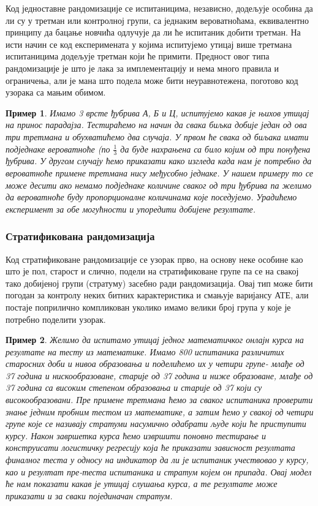 \documentclass[12pt, a4paper]{article}
\newtheorem{primer}{Пример}[section]
\begin{document}
Код једноставне рандомизације се испитаницима, независно, додељује особина да ли су у третман или контролној групи, са једнаким вероватноћама, еквивалентно принципу да бацање новчића 
одлучује да ли ће испитаник добити третман. На исти начин се код експеримената у којима испитујемо 
утицај више третмана испитаницима додељује третман који ће примити.
Предност овог типа рандомизације је што је лака за имплементацију и нема много правила и 
ограничења, али је мана што подела може бити неуравнотежена, поготово код узорака са мањим обимом.

\begin{primer}
Имамо 3 врсте ђубрива А, Б и Ц, испитујемо какав је њихов утицај на принос парадајза. 
Тестираћемо на начин да свака биљка добије један од ова три третмана и обухватићемо два случаја.
У првом ће свака од биљака имати подједнаке вероватноће (по $\frac{1}{3}$ да буде нахрањена са било којим 
од три понуђена ђубрива. У другом случају ћемо приказати како изгледа када нам је потребно да 
вероватноће примене третмана нису међусобно једнаке. У нашем примеру то се може десити ако немамо 
подједнаке количине сваког од три ђубрива па желимо да вероватноће буду пропорционалне количинама 
које поседујемо. Урадићемо експеримент за обе могућности и упоредити добијене резултате.
\end{primer}

\subsubsection*{Стратификована рандомизација}

Код стратификоване рандомизације се узорак прво, на основу неке особине као што је пол, старост и 
слично, подели на стратификоване групе па се на свакој тако добијеној групи (стратуму) засебно 
ради рандомизација. Овај тип може бити погодан за контролу неких битних карактеристика и смањује 
варијансу АТЕ, али постаје поприлично компликован уколико имамо велики број група у које је 
потребно поделити узорак. 

\begin{primer}
Желимо да испитамо утицај једног математичког онлајн курса на резултате на тесту из математике.
Имамо 800 испитаника различитих старосних доби и нивоа образовања и поделићемо их у четири групе-
млађе од 37 година и нискообразоване, старије од 37 година и ниже образоване, млађе од 37 година 
са високим степеном образовања и старије од 37 који су високообразовани.
Пре примене третмана ћемо за сваког испитаника проверити знање једним пробним тестом из математике, 
а затим ћемо у свакој од четири групе које се називају стратуми насумично одабрати људе који ће 
приступити курсу. Након завршетка курса ћемо извршити поновно тестирање и конструисати логистичку 
регресију која ће приказати зависност резултата финалног теста у односу на индикатор да ли је 
испитаник учествовао у курсу, као и резултат пре-теста испитаника и стратум којем он припада.
Овај модел ће нам показати какав је утицај слушања курса, а те резултате може приказати и за сваки 
појединачан стратум.
\end{primer}
\end{document}
